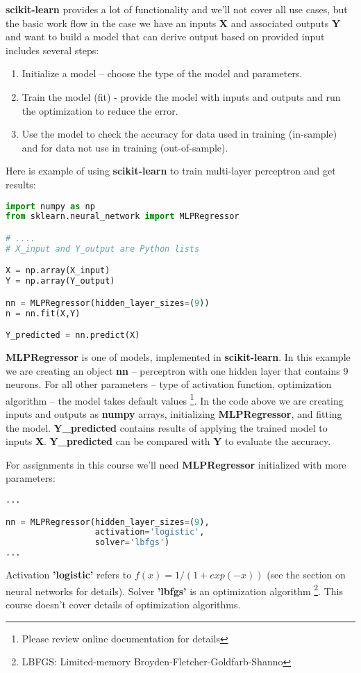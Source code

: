 \textbf{scikit-learn} provides a lot of functionality and we'll
not cover all use cases, but the basic work flow in the case we
have an inputs \textbf{X} and associated outputs \textbf{Y}
and want to build a model that can derive output based on provided
input includes several steps:
\begin{enumerate}
\item Initialize a model -- choose the type of the model and parameters.
\item Train the model (fit) - provide the model with inputs and 
outputs and run the optimization to reduce the error.
\item Use the model to check the accuracy for data used in training
(in-sample) and for data not use in training (out-of-sample).
\end{enumerate}

Here is example of using \textbf{scikit-learn} to train
multi-layer perceptron and get results:

\newpage

\begin{lstlisting}[language=Python,style=codelst2,caption={Python: using \textbf{scikit-learn} to train multi-layer perceptron}]
import numpy as np
from sklearn.neural_network import MLPRegressor

# .... 
# X_input and Y_output are Python lists

X = np.array(X_input)
Y = np.array(Y_output)

nn = MLPRegressor(hidden_layer_sizes=(9))
n = nn.fit(X,Y)

Y_predicted = nn.predict(X)
\end{lstlisting}
\textbf{MLPRegressor} is one of models, implemented in 
\textbf{scikit-learn}. In this example we are creating an object
\textbf{nn} -- perceptron with one hidden layer that contains
9 neurons. For all other parameters -- type of activation function,
optimization algorithm -- the model takes default values
\footnote{Please review online documentation for details}.
In the code above we are creating inputs and outputs 
as \textbf{numpy} arrays, initializing \textbf{MLPRegressor}, and
fitting the model. \textbf{Y\_predicted} contains results of
applying the trained model to inputs \textbf{X}. 
\textbf{Y\_predicted} can be compared with \textbf{Y} to
evaluate the accuracy.

For assignments in this course we'll need \textbf{MLPRegressor}
initialized with more parameters:
\begin{lstlisting}[language=Python,style=codelst2,caption={Python: initalization of \textbf{MLPRegressor}}]
...

nn = MLPRegressor(hidden_layer_sizes=(9),
                  activation='logistic', 
                  solver='lbfgs')
...
\end{lstlisting}
Activation \textbf{'logistic'} refers to $f(x) = 1/(1+exp(-x))$ 
(see the section on neural networks for details). Solver
\textbf{'lbfgs'} is an optimization algorithm
\footnote{LBFGS: Limited-memory Broyden-Fletcher-Goldfarb-Shanno}. 
This course doesn't cover details of optimization algorithms.

